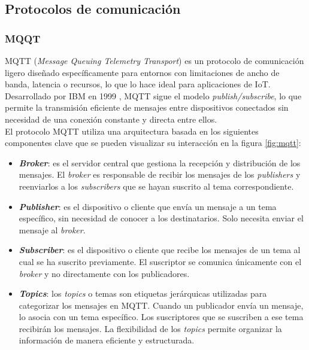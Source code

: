 \subsection{Protocolos de comunicación}
\subsubsection{MQQT}        

MQTT (\textit{Message Queuing Telemetry Transport}) es un protocolo de comunicación ligero diseñado específicamente para entornos con limitaciones de ancho de banda, latencia o recursos, lo que lo hace ideal para aplicaciones de IoT. Desarrollado por IBM en 1999 \cite{mqtt_ibm}, MQTT sigue el modelo \textit{publish/subscribe}, lo que permite la transmisión eficiente de mensajes entre dispositivos conectados sin necesidad de una conexión constante y directa entre ellos. \\


El protocolo MQTT utiliza una arquitectura basada en los siguientes componentes clave que se pueden visualizar su interacción en la figura \ref{fig:mqtt}:

\begin{itemize}
    \item \textbf{\textit{Broker}}: es el servidor central que gestiona la recepción y distribución de los mensajes. El \textit{broker} es responsable de recibir los mensajes de los \textit{publishers} y reenviarlos a los \textit{subscribers} que se hayan suscrito al tema correspondiente.

    \item \textbf{\textit{Publisher}}: es el dispositivo o cliente que envía un mensaje a un tema específico, sin necesidad de conocer a los destinatarios. Solo necesita enviar el mensaje al \textit{broker}.

    \item \textbf{\textit{Subscriber}}: es el dispositivo o cliente que recibe los mensajes de un tema al cual se ha suscrito previamente. El suscriptor se comunica únicamente con el \textit{broker} y no directamente con los publicadores.

    \item  \textbf{\textit{Topics}}: los \textit{topics} o temas son etiquetas jerárquicas utilizadas para categorizar los mensajes en MQTT. Cuando un publicador envía un mensaje, lo asocia con un tema específico. Los suscriptores que se suscriben a ese tema recibirán los mensajes. La flexibilidad de los \textit{topics} permite organizar la información de manera eficiente y estructurada.
\end{itemize}

